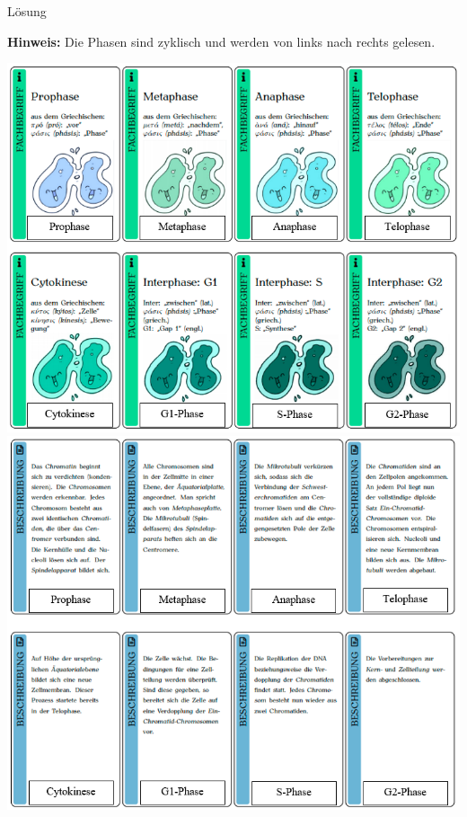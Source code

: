 \documentclass[parskip]{scrartcl}
\begin{document}
\begin{center}
	\begin{huge}
		\noindent Lösung\\
		
	\end{huge}

\noindent \textbf{Hinweis:}
Die Phasen sind zyklisch und werden von links nach rechts gelesen.

	\includegraphics[scale=0.75]{solution/fachbegriff.png} 
	\includegraphics[scale=0.75]{solution/beschreibung.png} 	

\end{center}
\end{document}
